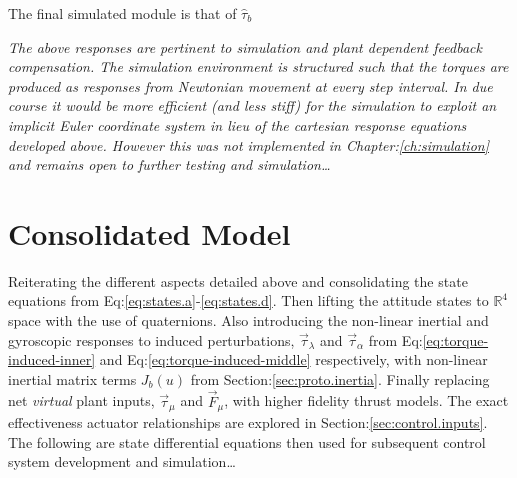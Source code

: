 \par
The final simulated module is that of $\hat{\tau}_b$
\par
\emph{\color{Gray}The above responses are pertinent to simulation and plant dependent feedback compensation. The simulation environment is structured such that the torques are produced as responses from Newtonian movement at every step interval. In due course it would be more efficient (and less stiff) for the simulation to exploit an implicit Euler\cite{physicallybased,multibodydynamics} coordinate system in lieu of the cartesian response equations developed above. However this was not implemented in Chapter:\ref{ch:simulation} and remains open to further testing and simulation\ldots}
\par
\newpage
\section{Consolidated Model}
\label{sec:dynamics.model}
Reiterating the different aspects detailed above and consolidating the state equations from Eq:\ref{eq:states.a}-\ref{eq:states.d}. Then lifting the attitude states to $\mathbb{R}^4$ space with the use of quaternions. Also introducing the non-linear inertial and gyroscopic responses to induced perturbations, $\vec{\tau}_\lambda$ and $\vec{\tau}_\alpha$ from Eq:\ref{eq:torque-induced-inner} and Eq:\ref{eq:torque-induced-middle} respectively, with non-linear inertial matrix terms $J_b(u)$ from Section:\ref{sec:proto.inertia}. Finally replacing net \emph{virtual} plant inputs, $\vec{\tau}_\mu$ and $\vec{F}_\mu$, with higher fidelity thrust models. The exact effectiveness actuator relationships are explored in Section:\ref{sec:control.inputs}. The following are state differential equations then used for subsequent control system development and simulation\ldots
\\
